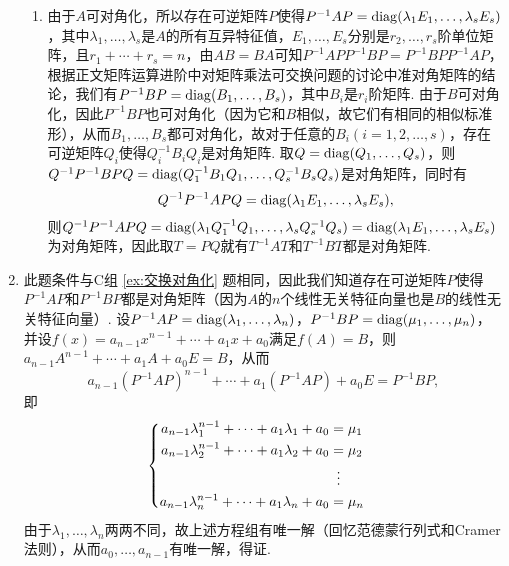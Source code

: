 \begin{enumerate}
\begin{enumerate}
              \item 由于$A$可对角化，所以存在可逆矩阵$P$使得$P^{-1}AP=\operatorname{diag}(\lambda_1E_1,\ldots,\lambda_sE_s)$，其中$\lambda_1,\ldots,\lambda_s$是$A$的所有互异特征值，$E_1,\ldots,E_s$分别是$r_2,\ldots,r_s$阶单位矩阵，且$r_1+\cdots+r_s=n$，由$AB=BA$可知$P^{-1}APP^{-1}BP=P^{-1}BPP^{-1}AP$，根据正文矩阵运算进阶中对矩阵乘法可交换问题的讨论中准对角矩阵的结论，我们有$P^{-1}BP=\operatorname{diag}(B_1,\ldots,B_s)$，其中$B_i$是$r_i$阶矩阵. 由于$B$可对角化，因此$P^{-1}BP$也可对角化（因为它和$B$相似，故它们有相同的相似标准形），从而$B_1,\ldots,B_s$都可对角化，故对于任意的$B_i(i=1,2,\ldots,s)$，存在可逆矩阵$Q_i$使得$Q_i^{-1}B_iQ_i$是对角矩阵. 取$Q=\operatorname{diag}(Q_1,\ldots,Q_s)$，则$Q^{-1}P^{-1}BPQ=\operatorname{diag}(Q_1^{-1}B_1Q_1,\ldots,Q_s^{-1}B_sQ_s)$是对角矩阵，同时有
                    \[Q^{-1}P^{-1}APQ=\operatorname{diag}(\lambda_1E_1,\ldots,\lambda_sE_s),\]
                    则$Q^{-1}P^{-1}APQ=\operatorname{diag}(\lambda_1Q_1^{-1}Q_1,\ldots,\lambda_sQ_s^{-1}Q_s)=\operatorname{diag}(\lambda_1E_1,\ldots,\lambda_sE_s)$为对角矩阵，因此取$T=PQ$就有$T^{-1}AT$和$T^{-1}BT$都是对角矩阵.
          \end{enumerate}

    \item 此题条件与C组 \ref*{ex:交换对角化} 题相同，因此我们知道存在可逆矩阵$P$使得$P^{-1}AP$和$P^{-1}BP$都是对角矩阵（因为$A$的$n$个线性无关特征向量也是$B$的线性无关特征向量）. 设$P^{-1}AP=\operatorname{diag}(\lambda_1,\ldots,\lambda_n)$，$P^{-1}BP=\operatorname{diag}(\mu_1,\ldots,\mu_n)$，并设$f(x)=a_{n-1}x^{n-1}+\cdots+a_1x+a_0$满足$f(A)=B$，则$a_{n-1}A^{n-1}+\cdots+a_1A+a_0E=B$，从而
          \[a_{n-1}(P^{-1}AP)^{n-1}+\cdots+a_1(P^{-1}AP)+a_0E=P^{-1}BP,\]
          即
          \[\begin{cases} \begin{aligned}
                      a_{n-1}\lambda_1^{n-1}+\cdots+a_1\lambda_1+a_0 & = \mu_1           \\
                      a_{n-1}\lambda_2^{n-1}+\cdots+a_1\lambda_2+a_0 & = \mu_2           \\
                                                                     & \vdotswithin{ = } \\
                      a_{n-1}\lambda_n^{n-1}+\cdots+a_1\lambda_n+a_0 & = \mu_n
                  \end{aligned} \end{cases}\]
          由于$\lambda_1,\ldots,\lambda_n$两两不同，故上述方程组有唯一解（回忆范德蒙行列式和Cramer法则），从而$a_0,\ldots,a_{n-1}$有唯一解，得证.
\end{enumerate}

\clearpage
